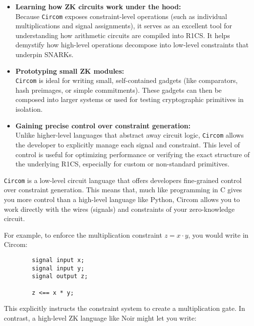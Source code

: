 \documentclass{article}
\begin{document}
	\begin{itemize}
		\item \textbf{Learning how ZK circuits work under the hood:} \\
		Because \texttt{Circom} exposes constraint-level operations (such as individual multiplications and signal assignments), it serves as an excellent tool for understanding how arithmetic circuits are compiled into R1CS. It helps demystify how high-level operations decompose into low-level constraints that underpin SNARKs.
		
		\item \textbf{Prototyping small ZK modules:} \\
		\texttt{Circom} is ideal for writing small, self-contained gadgets (like comparators, hash preimages, or simple commitments). These gadgets can then be composed into larger systems or used for testing cryptographic primitives in isolation.
		
		\item \textbf{Gaining precise control over constraint generation:} \\
		Unlike higher-level languages that abstract away circuit logic, \texttt{Circom} allows the developer to explicitly manage each signal and constraint. This level of control is useful for optimizing performance or verifying the exact structure of the underlying R1CS, especially for custom or non-standard primitives.
	\end{itemize}
	
	\begin{noteBox}
		\texttt{Circom} is a low-level circuit language that offers developers fine-grained control over constraint generation. This means that, much like programming in C gives you more control than a high-level language like Python, Circom allows you to work directly with the wires (signals) and constraints of your zero-knowledge circuit.
	\end{noteBox}
	
	\noindent For example, to enforce the multiplication constraint $z = x \cdot y$, you would write in Circom:
	
	\begin{verbatim}
		signal input x;
		signal input y;
		signal output z;
		
		z <== x * y;
	\end{verbatim}
	
	\noindent This explicitly instructs the constraint system to create a multiplication gate. In contrast, a high-level ZK language like Noir might let you write:
	
\end{document}
